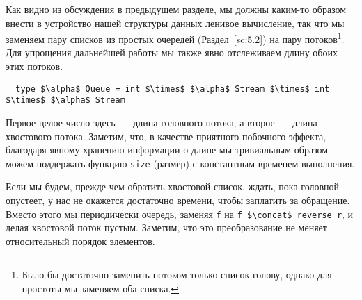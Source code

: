 Как видно из обсуждения в предыдущем разделе, мы должны каким-то
образом внести в устройство нашей структуры данных ленивое вычисление,
так что мы заменяем пару списков из простых очередей
(Раздел~\ref{sc:5.2}) на пару потоков\footnote{Было
  бы достаточно заменить потоком только список-голову, однако для
  простоты мы заменяем оба списка.%
}.
Для упрощения дальнейшей работы мы также явно отслеживаем длину обоих
этих потоков.
\begin{lstlisting}
  type $\alpha$ Queue = int $\times$ $\alpha$ Stream $\times$ int  $\times$ $\alpha$ Stream
\end{lstlisting}
Первое целое число здесь~--- длина головного потока, а второе~---
длина хвостового потока. Заметим, что, в качестве приятного побочного
эффекта, благодаря явному хранению информации о длине мы тривиальным
образом можем
поддержать функцию \lstinline!size! (размер) с константным временем выполнения.

Если мы будем, прежде чем обратить хвостовой список, ждать, пока
головной опустеет, у нас не окажется достаточно времени, чтобы
заплатить за обращение. Вместо этого мы периодически
 очередь, заменяя \lstinline!f! на
\lstinline!f $\concat$ reverse r!, и делая хвостовой поток
пустым. Заметим, что это преобразование не меняет относительный порядок
элементов.

